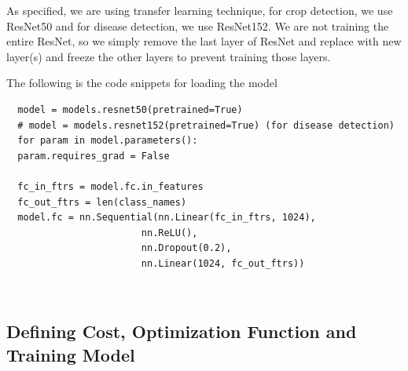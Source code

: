 \documentclass[../Report.tex]{subfiles}
\begin{document}
As specified, we are using transfer learning technique, for crop detection, we use ResNet50 and for disease detection, we use ResNet152.
We are not training the entire ResNet, so we simply remove the last layer of ResNet and replace with new layer(s) and freeze the other 
layers to prevent training those layers.

The following is the code snippets for loading the model
\begin{verbatim}
  model = models.resnet50(pretrained=True) 
  # model = models.resnet152(pretrained=True) (for disease detection)
  for param in model.parameters():
  param.requires_grad = False

  fc_in_ftrs = model.fc.in_features
  fc_out_ftrs = len(class_names)
  model.fc = nn.Sequential(nn.Linear(fc_in_ftrs, 1024),
                        nn.ReLU(),
                        nn.Dropout(0.2),
                        nn.Linear(1024, fc_out_ftrs))
\end{verbatim}
 ~\par

\subsection{Defining Cost, Optimization Function and Training Model}
\end{document}
